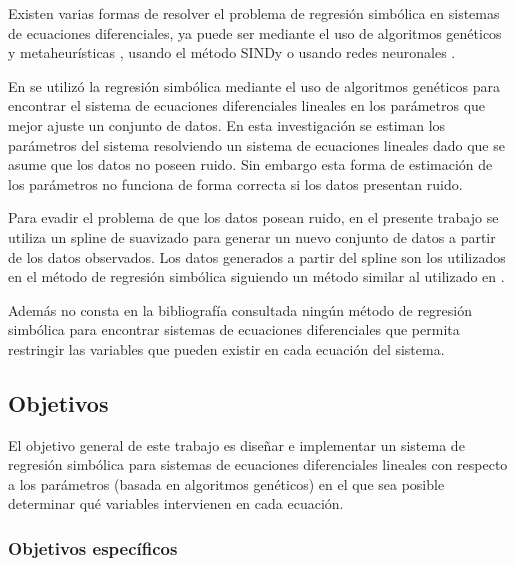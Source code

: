 Existen varias formas de resolver el problema de regresión simbólica en sistemas de ecuaciones diferenciales, ya puede ser mediante el uso de algoritmos genéticos y metaheurísticas \cite{koza1994genetic, schmidt2013eureqa}, usando el método SINDy \cite{brunton2016discovering} o usando redes neuronales \cite{udrescu2020ai}.

En \cite{iba2008inference} se utilizó la regresión simbólica mediante el uso de algoritmos genéticos para encontrar el sistema de ecuaciones diferenciales lineales en los parámetros que mejor ajuste un conjunto de datos. En esta investigación se estiman los parámetros del sistema resolviendo un sistema de ecuaciones lineales dado que se asume que los datos no poseen ruido. Sin embargo esta forma de estimación de los parámetros no funciona de forma correcta si los datos presentan ruido.

Para evadir el problema de que los datos posean ruido, en el presente trabajo se utiliza un spline de suavizado para generar un nuevo conjunto de datos a partir de los datos observados. Los datos generados a partir del spline son los utilizados en el método de regresión simbólica siguiendo un método similar al utilizado en \cite{iba2008inference}.

Además no consta en la bibliografía consultada ningún método de regresión simbólica para encontrar sistemas de ecuaciones diferenciales que permita restringir las variables que pueden existir en cada ecuación del sistema.


\subsection*{Objetivos}

El objetivo general de este trabajo es diseñar e implementar un sistema de regresión simbólica para sistemas de ecuaciones diferenciales lineales con respecto a los parámetros (basada en algoritmos genéticos) en el que sea posible determinar qué variables intervienen en cada ecuación.


\subsubsection*{Objetivos específicos}

